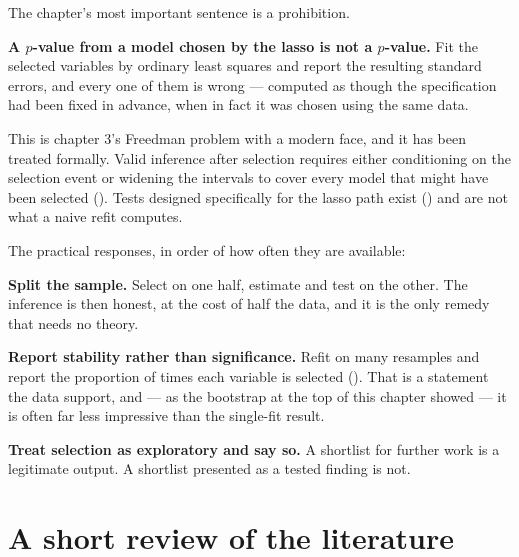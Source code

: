 \documentclass[
  letterpaper,
  10pt,
  twoside,
  openright,
  numbers=noenddot,
  chapterprefix=true]{scrbook}
\begin{document}
The chapter's most important sentence is a prohibition.

\begin{qmibwarn}

\textbf{A \(p\)-value from a model chosen by the lasso is not a
\(p\)-value.} Fit the selected variables by ordinary least squares and
report the resulting standard errors, and every one of them is wrong ---
computed as though the specification had been fixed in advance, when in
fact it was chosen using the same data.

\end{qmibwarn}

This is chapter 3's Freedman problem with a modern face, and it has been
treated formally. Valid inference after selection requires either
conditioning on the selection event or widening the intervals to cover
every model that might have been selected (). Tests designed specifically for the lasso path exist
() and are not what a
naive refit computes.

The practical responses, in order of how often they are available:

\textbf{Split the sample.} Select on one half, estimate and test on the
other. The inference is then honest, at the cost of half the data, and
it is the only remedy that needs no theory.

\textbf{Report stability rather than significance.} Refit on many
resamples and report the proportion of times each variable is selected
(). That is
a statement the data support, and --- as the bootstrap at the top of
this chapter showed --- it is often far less impressive than the
single-fit result.

\textbf{Treat selection as exploratory and say so.} A shortlist for
further work is a legitimate output. A shortlist presented as a tested
finding is not.

\section{A short review of the
literature}\label{a-short-review-of-the-literature-3}
\end{document}
